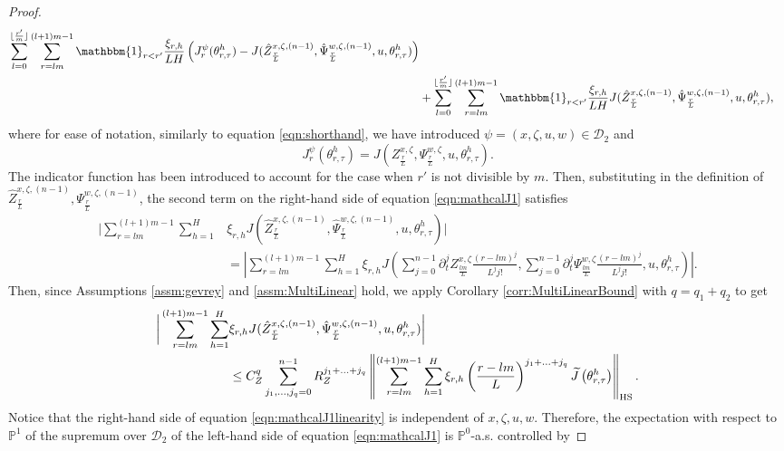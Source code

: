 \documentclass{article}
\begin{document}
\begin{appendices}
\begin{proof}
\begin{align}
     \sum_{l=0}^{\lfloor\frac{r'}{m} \rfloor }\sum_{r=lm}^{(l+1)m-1} \mathbbm{1}_{r<r'}\frac{\xi_{r,h}}{LH}\left(J^{\psi}_r(\theta^h_{r,\tau})-J(\hat Z^{x,\zeta,(n-1)}_\frac{r}{L},\hat \Psi^{w,\zeta,(n-1)}_\frac{r}{L},u,\theta^h_{r,\tau})\right)\\
    &+  \sum_{l=0}^{\lfloor\frac{r'}{m} \rfloor }\sum_{r=lm}^{(l+1)m-1}\mathbbm{1}_{r<r'} \frac{\xi_{r,h}}{LH}J(\hat Z^{x,\zeta,(n-1)}_\frac{r}{L},\hat \Psi^{w,\zeta,(n-1)}_\frac{r}{L},u,\theta^h_{r,\tau}),\label{eqn:mathcalJ1}
\end{align}
where for ease of notation, similarly to equation \eqref{eqn:shorthand}, we have introduced $\psi = (x,\zeta,u,w)\in \mathscr{D}_2$ and
\[
J^\psi_r(\theta^h_{r,\tau})= J(Z^{x,\zeta}_\frac{r}{L}, \Psi^{w,\zeta}_\frac{r}{L} ,u, \theta^h_{r,\tau}).
\]
The indicator function has been introduced to account for the case when $r'$ is not divisible by $m$.
Then, substituting in the definition of $\hat Z^{x,\zeta,(n-1)}_\frac{r}{L}, \Psi^{w,\zeta,(n-1)}_\frac{r}{L}$, the second term on the right-hand side of equation \eqref{eqn:mathcalJ1} satisfies
\begin{align*}
    \bigg|\sum_{r=lm}^{(l+1)m-1}\sum_{h=1}^H &\xi_{r,h}J(\hat Z^{x,\zeta,(n-1)}_\frac{r}{L},\hat \Psi^{w,\zeta,(n-1)}_\frac{r}{L},u,\theta^h_{r,\tau})\bigg| \\&= 
    \left| \sum_{r=lm}^{(l+1)m-1}\sum_{h=1}^H \xi_{r,h}J\left(\sum_{j=0}^{n-1}\partial_t^j Z^{x,\zeta}_\frac{lm}{L}\frac{(r-lm)^j}{L^jj!},\sum_{j=0}^{n-1}\partial_t^j \Psi^{w,\zeta}_\frac{lm}{L}\frac{(r-lm)^j}{L^jj!},u,\theta^h_{r,\tau}\right)\right|.
\end{align*}
Then, since Assumptions \ref{assm:gevrey} and \ref{assm:MultiLinear} hold, we apply Corollary \ref{corr:MultiLinearBound} with $q=q_1+q_2$ to get
\begin{align}
\bigg|\sum_{r=lm}^{(l+1)m-1}\sum_{h=1}^H &\xi_{r,h}J(\hat Z^{x,\zeta,(n-1)}_\frac{r}{L},\hat \Psi^{w,\zeta,(n-1)}_\frac{r}{L},u,\theta^h_{r,\tau})\bigg| \label{eqn:mathcalJ1linearity}\\&\le C_Z^{q}\sum_{j_{1},\ldots, j_q=0}^{n-1} R_Z^{j_1+ \ldots +j_q} \left\Vert \sum_{r=lm}^{(l+1)m-1} \sum_{h=1}^H \xi_{r,h}\left(\frac{r-lm}{L} \right)^{j_1+ \ldots + j_q}\widetilde J\left( \theta^h_{r,\tau}\right) \right\Vert_\mathrm{HS}.\notag
\end{align}
Notice that the right-hand side of equation \eqref{eqn:mathcalJ1linearity} is independent of $x,\zeta,u,w$. Therefore, the expectation with respect to $\mathbb P^1$ of the supremum over $\mathscr D_2$ of the left-hand side of equation \eqref{eqn:mathcalJ1} is $\mathbb P^0$-a.s. controlled by 

\end{proof}
\end{appendices}
\end{document}
